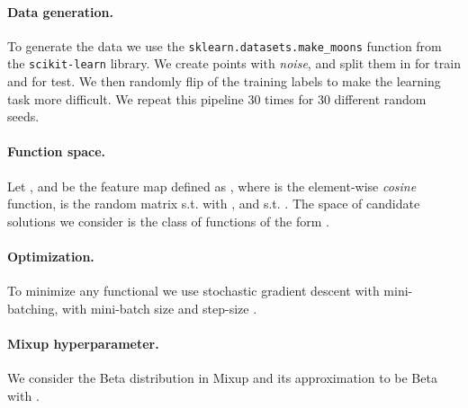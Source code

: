 \documentclass[twoside,11pt]{article}
\begin{document}
\paragraph{Data generation.} 
To generate the data we use the \texttt{sklearn.datasets.make\_moons} function from the \texttt{scikit-learn} library.
We create  points with \emph{noise}, and split them in  for train and  for test. We then randomly flip  of the training labels to make the learning task more difficult. We repeat this pipeline 30 times for 30 different random seeds.

\paragraph{Function space.}
Let ,  and  be the feature map defined as , where  is the element-wise \emph{cosine} function,  is the random matrix s.t.  with , and  s.t. .
The space of candidate solutions  we consider is the class of functions of the form .

\paragraph{Optimization.}
To minimize any functional we use stochastic gradient descent with mini-batching, with mini-batch size  and step-size .

\paragraph{Mixup hyperparameter.} We consider the Beta distribution in Mixup and its approximation to be Beta with .


 
\end{document}
